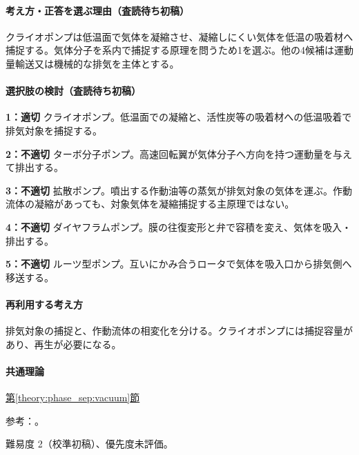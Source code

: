 \paragraph{考え方・正答を選ぶ理由（査読待ち初稿）} クライオポンプは低温面で気体を凝縮させ、凝縮しにくい気体を低温の吸着材へ捕捉する。気体分子を系内で捕捉する原理を問うため1を選ぶ。他の4候補は運動量輸送又は機械的な排気を主体とする。

\paragraph{選択肢の検討（査読待ち初稿）}\mbox{}\par

\noindent\textbf{1：適切} クライオポンプ。低温面での凝縮と、活性炭等の吸着材への低温吸着で排気対象を捕捉する。\par

\noindent\textbf{2：不適切} ターボ分子ポンプ。高速回転翼が気体分子へ方向を持つ運動量を与えて排出する。\par

\noindent\textbf{3：不適切} 拡散ポンプ。噴出する作動油等の蒸気が排気対象の気体を運ぶ。作動流体の凝縮があっても、対象気体を凝縮捕捉する主原理ではない。\par

\noindent\textbf{4：不適切} ダイヤフラムポンプ。膜の往復変形と弁で容積を変え、気体を吸入・排出する。\par

\noindent\textbf{5：不適切} ルーツ型ポンプ。互いにかみ合うロータで気体を吸入口から排気側へ移送する。\par

\paragraph{再利用する考え方} 排気対象の捕捉と、作動流体の相変化を分ける。クライオポンプには捕捉容量があり、再生が必要になる。

\paragraph{共通理論} \hyperref[theory:phase_sep:vacuum]{第\ref*{theory:phase_sep:vacuum}節}

\par 参考：\cite{leybold_cryopump}。

\par 難易度 2（校準初稿）、優先度未評価。

